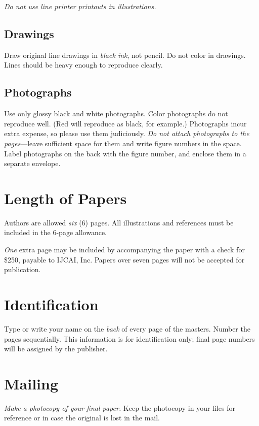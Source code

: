{\em Do not use line printer printouts in illustrations.}

\subsection{Drawings}

Draw original line drawings in {\em black ink}, not pencil.  Do not color
in drawings.  Lines should be heavy enough to reproduce clearly.

\subsection{Photographs}

Use only glossy black and white photographs.  Color photographs do not
reproduce well.  (Red will reproduce as black, for example.)  Photographs
incur extra expense, so please use them judiciously.  {\em Do not attach
photographs to the pages}---leave sufficient space for them and write
figure numbers in the space.  Label photographs on the back with the figure
number, and enclose them in a separate envelope.

\section{Length of Papers}

Authors are allowed {\em six\/} (6) pages.  All illustrations and
references must be included in the 6-page allowance.  

{\em One} extra page may be included by accompanying the paper with a check
for \$250, payable to IJCAI, Inc.
Papers over seven pages will not be accepted for publication.

\section{Identification}

Type or write your name on the {\em back\/} of every page of the masters.
Number the pages sequentially.  This information is for identification only;
final page numbers will be assigned by the publisher.

\section{Mailing}

{\em Make a photocopy of your final paper.}  Keep the photocopy in your
files for reference or in case the original is lost in the mail.

